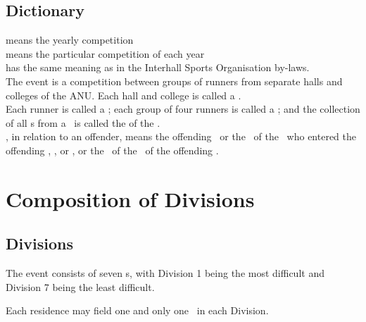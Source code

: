 \documentclass[12pt]{report}
\begin{document}
  \section{Dictionary}
   means the yearly competition\\[12pt]
   means the particular competition of each year\\[12pt]
   has the same meaning as in the Interhall Sports Organisation by-laws.\\[12pt]
  The event is a competition between groups of runners from separate halls and colleges of the ANU. Each hall and college is called a .\\[12pt]
  Each runner is called a ; each group of four runners is called a ; and the collection of all \competitor s from a \residence\ is called the  of the \residence.
  \\[12pt]
  , in relation to an offender, means the offending \residence\ or the \residence\ of the \Captain\ who entered the offending \competitor, \team, or \squad, or the \residence\ of the \President\ of the offending \spectator.
  \chapter{Composition of Divisions}
  \section{Divisions}
  \begin{fenumerate}
\item  The event consists of seven s, with Division 1 being the most difficult and Division 7 being the least difficult.
\item Each residence may field one and only one \team\ in each Division.
\end{fenumerate}
\end{document}
